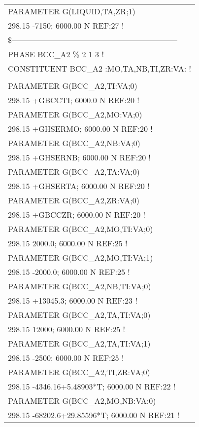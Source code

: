 \begin{longtable}[H]{ l l l }
	PARAMETER G(LIQUID,TA,ZR;1) & & \\
	\multicolumn{3}{l}{298.15 -7150;   6000.00 N REF:27 !}\\
	\multicolumn{3}{l}{\$---------------------------------------------------------------}\\
	\multicolumn{3}{l}{PHASE BCC\_A2 \% 2 1 3 !}\\
	\multicolumn{3}{l}{CONSTITUENT BCC\_A2 :MO,TA,NB,TI,ZR:VA: !}\\
	& & \\
	PARAMETER G(BCC\_A2,TI:VA;0) & & \\
	\multicolumn{3}{l}{298.15 +GBCCTI; 6000.0  N REF:20 !}\\
	PARAMETER G(BCC\_A2,MO:VA;0) & & \\
	\multicolumn{3}{l}{298.15 +GHSERMO; 6000.00 N REF:20 !}\\
	PARAMETER G(BCC\_A2,NB:VA;0) & & \\
	\multicolumn{3}{l}{298.15 +GHSERNB; 6000.00 N REF:20 !}\\ 
	PARAMETER G(BCC\_A2,TA:VA;0) & & \\
	\multicolumn{3}{l}{298.15 +GHSERTA; 6000.00 N REF:20 !}\\
	PARAMETER G(BCC\_A2,ZR:VA;0) & & \\
	\multicolumn{3}{l}{298.15 +GBCCZR; 6000.00 N REF:20 !}\\
	PARAMETER G(BCC\_A2,MO,TI:VA;0) & & \\
	\multicolumn{3}{l}{298.15   2000.0; 6000.00 N REF:25 !}\\
	PARAMETER G(BCC\_A2,MO,TI:VA;1) & & \\
	\multicolumn{3}{l}{298.15  -2000.0; 6000.00 N REF:25 !}\\
	PARAMETER G(BCC\_A2,NB,TI:VA;0) & & \\
	\multicolumn{3}{l}{298.15  +13045.3; 6000.00 N REF:23 !}\\	 
	PARAMETER G(BCC\_A2,TA,TI:VA;0) & & \\
	\multicolumn{3}{l}{298.15  12000; 6000.00 N REF:25 !}\\
	PARAMETER G(BCC\_A2,TA,TI:VA;1) & & \\
	\multicolumn{3}{l}{298.15  -2500; 6000.00 N REF:25 !}\\	 
	PARAMETER G(BCC\_A2,TI,ZR:VA;0) & & \\
	\multicolumn{3}{l}{298.15  -4346.16+5.48903*T; 6000.00 N REF:22  !}\\	 
	PARAMETER G(BCC\_A2,MO,NB:VA;0) & & \\
	\multicolumn{3}{l}{298.15 -68202.6+29.85596*T; 6000.00 N REF:21 !}\\

\end{longtable}
